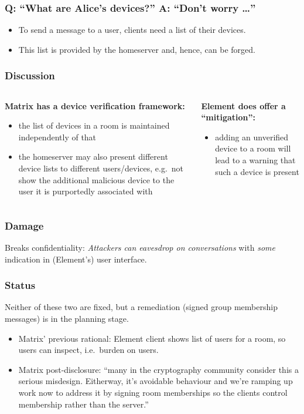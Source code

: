 \documentclass[aspectratio=169]{beamer}
\begin{document}
\begin{frame}
  \frametitle{Q: ``What are Alice's devices?'' A: ``Don't worry \dots''}

  \begin{itemize}
  \item To send a message to a user, clients need a list of their devices.
  \item This list is \alert{provided by the homeserver} and, hence, can be forged.
  \end{itemize}

\end{frame}

\begin{frame}
  \frametitle{Discussion}
  \begin{columns}[t]
    \begin{column}{0.5\columnwidth}
      \textbf{Matrix has a device verification framework:}
      \begin{itemize}
      \item the list of devices in a room is maintained independently of that
      \item the homeserver may also present different device lists to different users/devices, e.g.~not show the additional malicious device to the user it is purportedly associated with
      \end{itemize}
    \end{column}
    \begin{column}{0.5\columnwidth}
      \textbf{Element does offer a ``mitigation'':}
      \begin{itemize}
      \item adding an unverified device to a room will lead to a warning that such a device is present
      \end{itemize}
    \end{column}
  \end{columns}
\end{frame}

\begin{frame}
  \frametitle{Damage}
  Breaks confidentiality: \emph{Attackers can eavesdrop on conversations }
  \vspace{1em}
  with \emph{some} indication in (Element's) user interface.
\end{frame}

\begin{frame}
  \frametitle{Status}
  Neither of these two are fixed, but a remediation (signed group membership messages) is in the planning stage.
  \begin{itemize}
  \item Matrix' previous rational: Element client shows list of users for a room, so users can inspect, i.e.~burden on users.
  \item Matrix post-disclosure: ``many in the cryptography community consider this a serious misdesign. Eitherway, it’s avoidable behaviour and we’re ramping up work now to address it by signing room memberships so the clients control membership rather than the server.''
  \end{itemize}
\end{frame}
\end{document}
